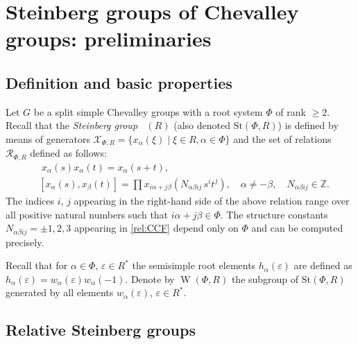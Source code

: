 \documentclass[oneside,12pt]{amsart}
\numberwithin{equation}{section}
\numberwithin{lem}{section}
\theoremstyle{definition}
\theoremstyle{remark}
\DeclareMathOperator{\St}{St^G}
\DeclareMathOperator{\WW}{W}
\newcommand{\Stb}{\mathrm{St}}
\begin{document}
\section{Steinberg groups of Chevalley groups: preliminaries}


\subsection{Definition and basic properties}
Let $G$ be a split simple Chevalley groups with a root system $\Phi$ of rank $\geq 2$.
Recall that the \emph{Steinberg group} $\St(R)$ (also denoted $\Stb(\Phi, R)$) is defined by means of generators 
$\mathcal{X}_{\Phi, R} = \{x_{\alpha}(\xi) \mid \xi\in R, \alpha\in\Phi\}$ and the set of relations $\mathcal{R}_{\Phi, R}$ defined as follows:
\begin{align}
& \phantom{[}
x_\alpha(s) x_\alpha(t) = x_\alpha(s+t), \label{rel:add}\\
& [x_\alpha(s), x_\beta(t)] = \prod x_{i\alpha + j\beta}\left(N_{\alpha\beta ij}\, s^i t^j\right), \quad \alpha\neq-\beta, \quad N_{\alpha\beta ij}\in\mathbb{Z}. \label{rel:CCF}
\end{align} 
The indices $i$, $j$ appearing in the right-hand side of the above relation range over all positive natural numbers such that $i\alpha + j\beta\in\Phi$.
The structure constants $N_{\alpha \beta i j}=\pm 1,2,3$ appearing in \eqref{rel:CCF} depend only on $\Phi$ and can be computed precisely.

Recall that for $\alpha\in\Phi$, $\varepsilon\in R^*$ the semisimple root elements $h_\alpha(\varepsilon)$ are defined as $h_\alpha(\varepsilon)=w_\alpha(\varepsilon)w_\alpha(-1)$.
Denote by $\WW(\Phi, R)$ the subgroup of $\Stb(\Phi, R)$ generated by all elements $w_\alpha(\varepsilon)$, $\varepsilon\in R^*$.


\subsection{Relative Steinberg groups}
\end{document}

